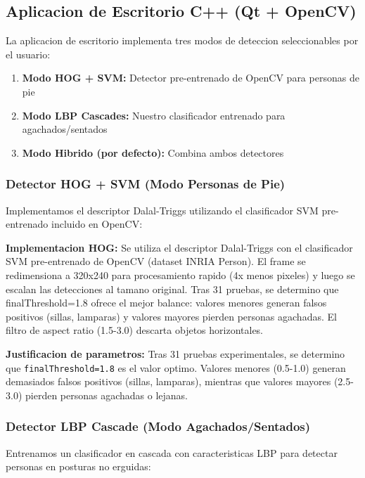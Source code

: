 \documentclass[conference]{IEEEtran}
\begin{document}
\subsection{Aplicacion de Escritorio C++ (Qt + OpenCV)}

La aplicacion de escritorio implementa tres modos de deteccion seleccionables por el usuario:

\begin{enumerate}
    \item \textbf{Modo HOG + SVM:} Detector pre-entrenado de OpenCV para personas de pie
    \item \textbf{Modo LBP Cascades:} Nuestro clasificador entrenado para agachados/sentados
    \item \textbf{Modo Hibrido (por defecto):} Combina ambos detectores
\end{enumerate}

\subsubsection{Detector HOG + SVM (Modo Personas de Pie)}

Implementamos el descriptor Dalal-Triggs \cite{dalal2005histograms} utilizando el clasificador SVM pre-entrenado incluido en OpenCV:

\textbf{Implementacion HOG:} Se utiliza el descriptor Dalal-Triggs con el clasificador SVM pre-entrenado de OpenCV (dataset INRIA Person). El frame se redimensiona a 320x240 para procesamiento rapido (4x menos pixeles) y luego se escalan las detecciones al tamano original. Tras 31 pruebas, se determino que finalThreshold=1.8 ofrece el mejor balance: valores menores generan falsos positivos (sillas, lamparas) y valores mayores pierden personas agachadas. El filtro de aspect ratio (1.5-3.0) descarta objetos horizontales.

\textbf{Justificacion de parametros:} Tras 31 pruebas experimentales, se determino que \texttt{finalThreshold=1.8} es el valor optimo. Valores menores (0.5-1.0) generan demasiados falsos positivos (sillas, lamparas), mientras que valores mayores (2.5-3.0) pierden personas agachadas o lejanas.

\subsubsection{Detector LBP Cascade (Modo Agachados/Sentados)}

Entrenamos un clasificador en cascada con caracteristicas LBP \cite{ojala2002multiresolution} para detectar personas en posturas no erguidas:
\end{document}
